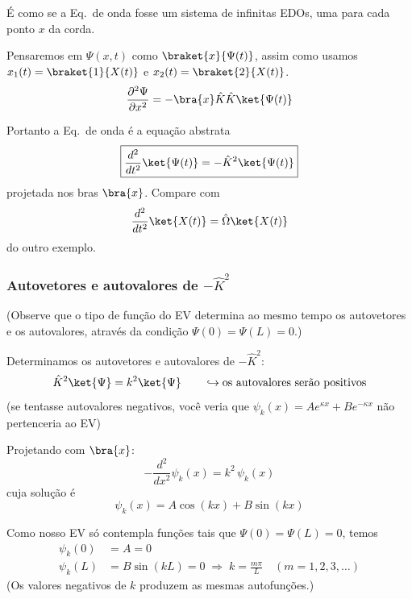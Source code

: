 É como se a Eq.\ de onda fosse um sistema de infinitas EDOs, uma para cada ponto $x$ da corda.

Pensaremos em $\Psi(x,t)$ como $\braket{x}{\Psi(t)}$, assim como usamos $x_1(t) = \braket{1}{X(t)}$ e $x_2(t) = \braket{2}{X(t)}$.
\begin{equation}
\frac{\partial^2 \Psi}{\partial x^2} = -\bra{x}\hat{K}\hat{K}\ket{\Psi(t)}
\label{eq:aula7_d2psi_dx2}
\end{equation}

Portanto a Eq.\ de onda é a equação abstrata
\begin{equation}
\boxed{\frac{d^2}{dt^2}\ket{\Psi(t)} = -\hat{K}^2\ket{\Psi(t)}}
\label{eq:aula7_eq_onda_abstrata}
\end{equation}
projetada nos bras $\bra{x}$. Compare com
\begin{equation}
\frac{d^2}{dt^2}\ket{X(t)} = \hat{\Omega}\ket{X(t)}
\label{eq:aula7_eq_outro_exemplo}
\end{equation}
do outro exemplo.

\subsubsection*{Autovetores e autovalores de $-\hat{K}^2$}

(Observe que o tipo de função do EV determina ao mesmo tempo os autovetores e os autovalores, através da condição $\Psi(0)=\Psi(L)=0$.)

Determinamos os autovetores e autovalores de $-\hat{K}^2$:
\begin{equation}
\hat{K}^2\ket{\Psi} = k^2\ket{\Psi} \qquad \hookrightarrow \text{os autovalores serão positivos}
\label{eq:aula7_K2_autovalor}
\end{equation}
(se tentasse autovalores negativos, você veria que $\psi_k(x) = A e^{\kappa x} + B e^{-\kappa x}$ não pertenceria ao EV)

Projetando com $\bra{x}$:
\begin{equation}
-\frac{d^2}{dx^2}\psi_k(x) = k^2\,\psi_k(x)
\label{eq:aula7_K2_edo}
\end{equation}
cuja solução é
\begin{equation}
\psi_k(x) = A\cos(kx) + B\sin(kx)
\label{eq:aula7_K2_solucao}
\end{equation}

Como nosso EV só contempla funções tais que $\Psi(0) = \Psi(L) = 0$, temos
\begin{align}
\psi_k(0) &= A = 0 \label{eq:aula7_cc_0}\\
\psi_k(L) &= B\sin(kL) = 0 \;\Rightarrow\; k = \frac{m\pi}{L} \quad (m=1,2,3,\dots) \label{eq:aula7_cc_L}
\end{align}
(Os valores negativos de $k$ produzem as mesmas autofunções.)


